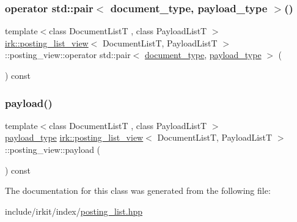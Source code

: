 \mbox{\label{classirk_1_1posting__list__view_1_1posting__view_acc98480fbaa34584c5150329d70cf721}} 
\subsubsection{\texorpdfstring{operator std\+::pair$<$ document\+\_\+type, payload\+\_\+type $>$()}{operator std::pair< document\_type, payload\_type >()}}
{\footnotesize\ttfamily template$<$class Document\+ListT , class Payload\+ListT $>$ \\
\mbox{\hyperlink{classirk_1_1posting__list__view}{irk\+::posting\+\_\+list\+\_\+view}}$<$ Document\+ListT, Payload\+ListT $>$\+::posting\+\_\+view\+::operator std\+::pair$<$ \mbox{\hyperlink{classirk_1_1posting__list__view_ac4615e6e3d8ee1eb9a847b7a34919977}{document\+\_\+type}}, \mbox{\hyperlink{classirk_1_1posting__list__view_a1c394061061a8eeeab98cb228f6cdde9}{payload\+\_\+type}} $>$ (\begin{DoxyParamCaption}{ }\end{DoxyParamCaption}) const\hspace{0.3cm}{\ttfamily [inline]}}

\mbox{\label{classirk_1_1posting__list__view_1_1posting__view_a1cfdff00da3bfc7d42d0a487065ee9e5}} 
\subsubsection{\texorpdfstring{payload()}{payload()}}
{\footnotesize\ttfamily template$<$class Document\+ListT , class Payload\+ListT $>$ \\
\mbox{\hyperlink{classirk_1_1posting__list__view_a1c394061061a8eeeab98cb228f6cdde9}{payload\+\_\+type}} \mbox{\hyperlink{classirk_1_1posting__list__view}{irk\+::posting\+\_\+list\+\_\+view}}$<$ Document\+ListT, Payload\+ListT $>$\+::posting\+\_\+view\+::payload (\begin{DoxyParamCaption}{ }\end{DoxyParamCaption}) const\hspace{0.3cm}{\ttfamily [inline]}}



The documentation for this class was generated from the following file\+:\begin{DoxyCompactItemize}
\item 
include/irkit/index/\mbox{\hyperlink{posting__list_8hpp}{posting\+\_\+list.\+hpp}}\end{DoxyCompactItemize}
